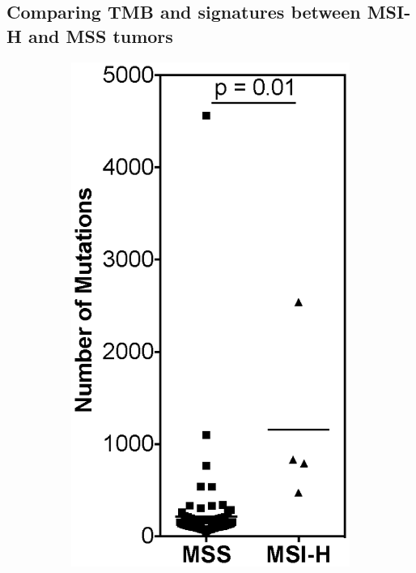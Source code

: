 \subsection{Comparing TMB and signatures between MSI-H and MSS tumors}
\begin{figure}[ht]
    \centering
    \hfill%
	\begin{subfigure}{0.25\textwidth}
		\includegraphics[width=\linewidth,keepaspectratio]{images/msilandscape/tmb_acc}

\end{subfigure}
\end{figure}
